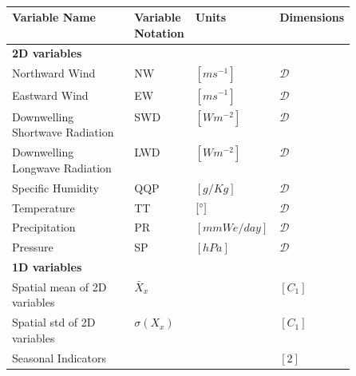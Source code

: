 \begin{table}[tbp]
    \centering
    \caption{}
    \renewcommand\arraystretch{1.5}
    \begin{tabular}{l>{\centering}p{0.1\linewidth}>{\centering}p{0.2\linewidth}>{\centering\arraybackslash}p{0.2\linewidth}}
    \toprule
        \textbf{Variable Name} & \textbf{Variable Notation} & \textbf{Units} & \textbf{Dimensions} \\ \toprule
        \textbf{2D variables} & & & \\ \bottomrule 
        Northward Wind & NW & $[ms^{-1}]$ & $ \mathcal{D}$   \\ 
        Eastward Wind & EW & $[ms^{-1}]$ & $ \mathcal{D}$ \\
        Downwelling Shortwave Radiation & SWD & $[Wm^{-2}]$ & $ \mathcal{D}$ \\
        Downwelling Longwave Radiation & LWD & $[Wm^{-2}]$ & $ \mathcal{D}$ \\
        Specific Humidity & QQP & $[g/Kg]$ & $ \mathcal{D}$ \\
        Temperature & TT & $[\degree]$ & $ \mathcal{D}$ \\
        Precipitation & PR & $[mmWe/day]$ & $ \mathcal{D}$  \\
        Pressure & SP & $[hPa]$ & $ \mathcal{D}$  \\
        \toprule
         \textbf{1D variables} & & & \\ \bottomrule
        Spatial mean of 2D variables & $\bar{X}_{x}$ & & $[C_1]$ \\ 
        Spatial std of 2D variables & $\sigma\left(X_{x}\right)$ & & $[C_1]$ \\
        Seasonal Indicators & & & $[2]$\\ \bottomrule
        
    \end{tabular}
            \label{tab:features}
\end{table}